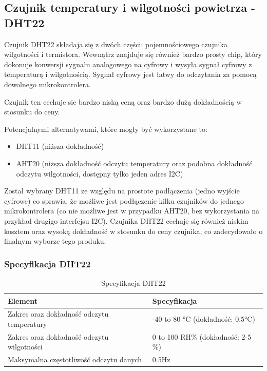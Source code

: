 \documentclass[12pt,a4paper]{article}
\begin{document}
\subsection{Czujnik temperatury i wilgotności powietrza - DHT22}

Czujnik DHT22 składaja się z dwóch części: pojemnościowego czujnika wilgotności i termistora. 
Wewnątrz znajduje się również bardzo prosty chip, który dokonuje konwersji sygnału analogowego na cyfrowy i wysyła sygnał cyfrowy z temperaturą i wilgotnością. 
Sygnał cyfrowy jest łatwy do odczytania za pomocą dowolnego mikrokontrolera.

Czujnik ten cechuje sie bardzo niską ceną oraz bardzo dużą dokładnością w stosunku do ceny.

Potencjalnymi alternatywami, które mogły być wykorzystane to:
\begin{itemize}
    \item DHT11 (niższa dokładność)
    \item AHT20 (niższa dokładność odczytu temperatury oraz podobna dokładność odczytu wilgotności, dostępny tylko jeden adres I2C)
\end{itemize}

Został wybrany DHT11 ze względu na prostote podłączenia (jedno wyjście cyfrowe) co sprawia, że możliwe jest podłączenie
kilku czujników do jednego mikrokontrolera (co nie możliwe jest w przypadku AHT20, bez wykorzystania na przykład drugigo interfejsu I2C).
Czujnika DHT22 cechuje się również niskim kosztem oraz wysoką dokładność w stosunku do ceny czujnika, co zadecydowało o finalnym wyborze tego produku. 

\subsubsection{Specyfikacja DHT22}

\begin{table}[H]
    \centering
    \begin{tabular}{|l|l|}
        \hline
        Element & Specyfikacja \\
        \hline
        Zakres oraz dokładność odczytu temperatury & -40 to 80 °C (dokładność: 0.5°C) \\
        \hline
        Zakres oraz dokładność odczytu wilgotności & 0 to 100 RH\% (dokładność: 2-5 \%) \\
        \hline
        Maksymalna częstotliwość odczytu danych & 0.5Hz \\
        \hline
    \end{tabular}
    \caption{Specyfikacja DHT22}
    \label{dht22-spec}
\end{table}
\end{document}
